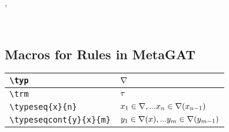 \documentclass[10pt,a4paper]{article}
\begin{document}
\begin{gatrules}
\gataxioms
{}
\begin{gatgroup}{,\ }
     \\
\end{gatgroup} \\
\end{gatrules}
 
\subsection{Macros for Rules in MetaGAT}


\begin{tabular}{| l | l |}
 \hline
 \verb!\typ!         &   $\nabla$    \\
 \hline
 \verb!\trm!         &   $\tau$     \\
 \hline
 \verb!\typeseq{x}{n}!  & $x_1 \in \nabla,... x_{n} \in \nabla(x_{n-1})$ \\
 \hline
 \verb!\typeseqcont{y}{x}{m}! & $y_1 \in \nabla({x}),... y_{m} \in \nabla(y_{m-1})$ \\
 \hline
\end{tabular}
\end{document}

